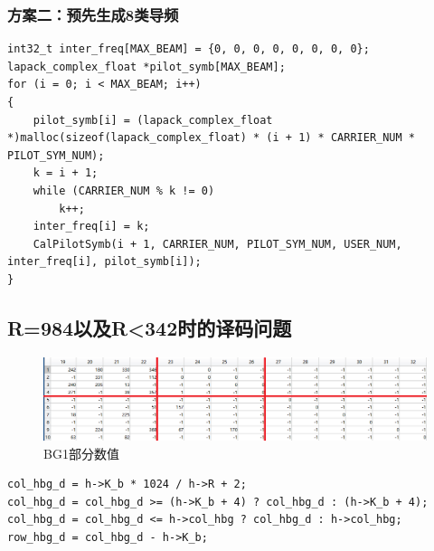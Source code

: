 \documentclass{article}
\begin{document}
\subsubsection{方案二：预先生成8类导频}
\lstset{language=C++}
\begin{lstlisting}
int32_t inter_freq[MAX_BEAM] = {0, 0, 0, 0, 0, 0, 0, 0};
lapack_complex_float *pilot_symb[MAX_BEAM];
for (i = 0; i < MAX_BEAM; i++)
{
	pilot_symb[i] = (lapack_complex_float *)malloc(sizeof(lapack_complex_float) * (i + 1) * CARRIER_NUM * PILOT_SYM_NUM);
	k = i + 1;
	while (CARRIER_NUM % k != 0)
		k++;
	inter_freq[i] = k;
	CalPilotSymb(i + 1, CARRIER_NUM, PILOT_SYM_NUM, USER_NUM, inter_freq[i], pilot_symb[i]);
}
\end{lstlisting}

\subsection{R=984以及R<342时的译码问题}
\begin{figure}[H]
	\centering
	\includegraphics[width = \textwidth]{bg.png}
	\caption{BG1部分数值}
\end{figure}
\begin{lstlisting}
col_hbg_d = h->K_b * 1024 / h->R + 2;
col_hbg_d = col_hbg_d >= (h->K_b + 4) ? col_hbg_d : (h->K_b + 4);
col_hbg_d = col_hbg_d <= h->col_hbg ? col_hbg_d : h->col_hbg;
row_hbg_d = col_hbg_d - h->K_b;
\end{lstlisting}
\end{document}
